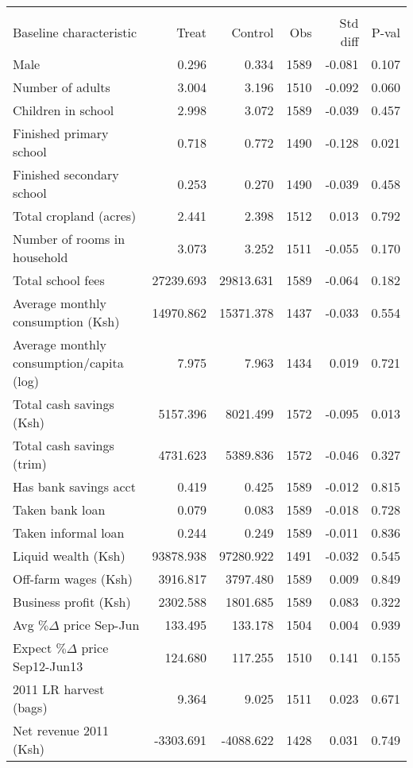 \begin{tabular}{lrrrrr}
\\[-1.8ex]\hline 
 \hline \\[-1.8ex]
Baseline characteristic & Treat & Control & Obs & Std diff & P-val \\
\midrule
Male & 0.296 & 0.334 & 1589 & -0.081 & 0.107 \\
Number of adults & 3.004 & 3.196 & 1510 & -0.092 & 0.060 \\
Children in school & 2.998 & 3.072 & 1589 & -0.039 & 0.457 \\
Finished primary school & 0.718 & 0.772 & 1490 & -0.128 & 0.021 \\
Finished secondary school & 0.253 & 0.270 & 1490 & -0.039 & 0.458 \\
Total cropland (acres) & 2.441 & 2.398 & 1512 & 0.013 & 0.792 \\
Number of rooms in household & 3.073 & 3.252 & 1511 & -0.055 & 0.170 \\
Total school fees & 27239.693 & 29813.631 & 1589 & -0.064 & 0.182 \\
Average monthly consumption (Ksh) & 14970.862 & 15371.378 & 1437 & -0.033 & 0.554 \\
Average monthly consumption/capita (log) & 7.975 & 7.963 & 1434 & 0.019 & 0.721 \\
Total cash savings (Ksh) & 5157.396 & 8021.499 & 1572 & -0.095 & 0.013 \\
Total cash savings (trim) & 4731.623 & 5389.836 & 1572 & -0.046 & 0.327 \\
Has bank savings acct & 0.419 & 0.425 & 1589 & -0.012 & 0.815 \\
Taken bank loan & 0.079 & 0.083 & 1589 & -0.018 & 0.728 \\
Taken informal loan & 0.244 & 0.249 & 1589 & -0.011 & 0.836 \\
Liquid wealth (Ksh) & 93878.938 & 97280.922 & 1491 & -0.032 & 0.545 \\
Off-farm wages (Ksh) & 3916.817 & 3797.480 & 1589 & 0.009 & 0.849 \\
Business profit (Ksh) & 2302.588 & 1801.685 & 1589 & 0.083 & 0.322 \\
Avg $\%\Delta$ price Sep-Jun & 133.495 & 133.178 & 1504 & 0.004 & 0.939 \\
Expect $\%\Delta$ price Sep12-Jun13 & 124.680 & 117.255 & 1510 & 0.141 & 0.155 \\
2011 LR harvest (bags) & 9.364 & 9.025 & 1511 & 0.023 & 0.671 \\
Net revenue 2011 (Ksh) & -3303.691 & -4088.622 & 1428 & 0.031 & 0.749 \\

\end{tabular}
